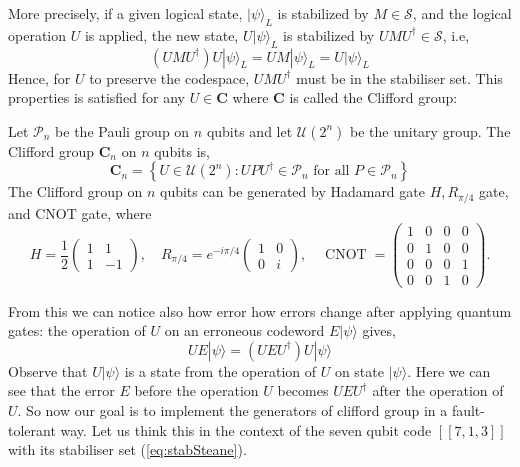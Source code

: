 More precisely, if a given logical state, $|\psi\rangle_{L}$ is stabilized by $M \in \mathcal{S}$, and the logical operation $U$ is applied, the new state, $U|\psi\rangle_{L}$ is stabilized by $U M U^{\dagger} \in \mathcal{S}$, i.e,
\begin{equation}
(U M U^{\dagger}) U|\psi\rangle_{L}=U M|\psi\rangle_{L}=U|\psi\rangle_{L}
\end{equation}
Hence, for $U$ to preserve the codespace, $U M U^{\dagger}$ must be in the stabiliser set.
This properties is satisfied for any $U \in \mathbf{C}$ where $\mathbf{C}$ is called the Clifford group:
\begin{definition}
Let $\mathcal{P}_{n}$ be the Pauli group on $n$ qubits and let $\mathcal{U}\left(2^{n}\right)$ be the unitary group. The Clifford group $\mathbf{C}_{n}$ on $n$ qubits is,
\begin{equation}
\mathbf{C}_{n}=\left\{U \in \mathcal{U}\left(2^{n}\right): U P U^{\dagger} \in \mathcal{P}_{n} \text { for all } P \in \mathcal{P}_{n}\right\}
\end{equation}
The Clifford group on $n$ qubits can be generated by Hadamard gate $H, R_{\pi / 4}$ gate, and CNOT gate, where
$$
H=\frac{1}{2}\left(\begin{array}{cc}
1 & 1 \\
1 & -1
\end{array}\right), \quad R_{\pi / 4}=e^{-i \pi / 4}\left(\begin{array}{cc}
1 & 0 \\
0 & i
\end{array}\right), \quad \operatorname{CNOT}=\left(\begin{array}{cccc}
1 & 0 & 0 & 0 \\
0 & 1 & 0 & 0 \\
0 & 0 & 0 & 1 \\
0 & 0 & 1 & 0
\end{array}\right) .
$$
\end{definition}
From this we can notice also how error how errors change after applying quantum gates: 
the operation of $U$ on an erroneous codeword $E|\psi\rangle$ gives,
\begin{equation}
U E|\psi\rangle=\left(U E U^{\dagger}\right) U|\psi\rangle
\label{eq:spread}
\end{equation}
Observe that $U|\psi\rangle$ is a state from the operation of $U$ on state $|\psi\rangle$.
Here we can see that the error $E$ before the operation $U$ becomes $U E U^{\dagger}$ after the operation of $U$. 
So now our goal is to implement the generators of clifford group in a fault-tolerant way. Let us think this in the context of the seven qubit code $[[7,1,3]]$ with its stabiliser set (\ref{eq:stabSteane}). 

